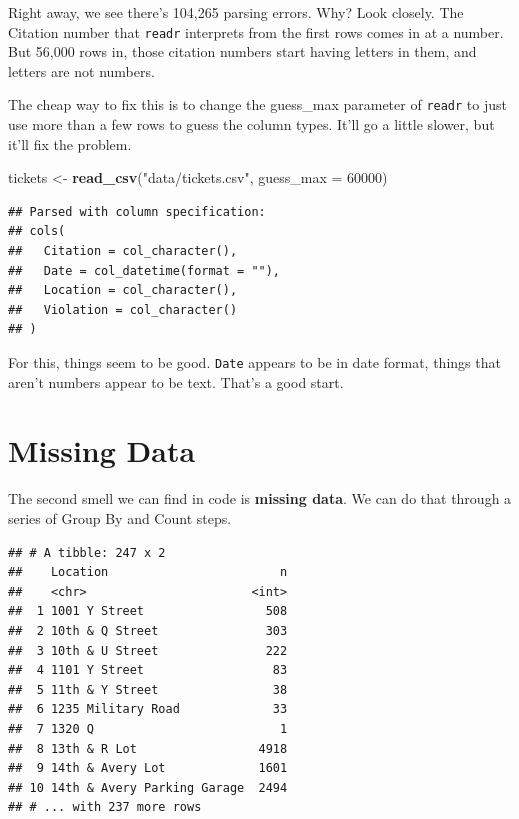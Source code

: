 \documentclass[]{book}
\newenvironment{Shaded}{\begin{snugshade}}{\end{snugshade}}
\newcommand{\DataTypeTok}[1]{\textcolor[rgb]{0.13,0.29,0.53}{#1}}
\newcommand{\DecValTok}[1]{\textcolor[rgb]{0.00,0.00,0.81}{#1}}
\newcommand{\KeywordTok}[1]{\textcolor[rgb]{0.13,0.29,0.53}{\textbf{#1}}}
\newcommand{\NormalTok}[1]{#1}
\newcommand{\OperatorTok}[1]{\textcolor[rgb]{0.81,0.36,0.00}{\textbf{#1}}}
\newcommand{\StringTok}[1]{\textcolor[rgb]{0.31,0.60,0.02}{#1}}
\begin{document}
Right away, we see there's 104,265 parsing errors. Why? Look closely. The Citation number that \texttt{readr} interprets from the first rows comes in at a number. But 56,000 rows in, those citation numbers start having letters in them, and letters are not numbers.

The cheap way to fix this is to change the guess\_max parameter of \texttt{readr} to just use more than a few rows to guess the column types. It'll go a little slower, but it'll fix the problem.

\begin{Shaded}
\begin{Highlighting}[]
\NormalTok{tickets <-}\StringTok{ }\KeywordTok{read_csv}\NormalTok{(}\StringTok{"data/tickets.csv"}\NormalTok{, }\DataTypeTok{guess_max =} \DecValTok{60000}\NormalTok{)}
\end{Highlighting}
\end{Shaded}

\begin{verbatim}
## Parsed with column specification:
## cols(
##   Citation = col_character(),
##   Date = col_datetime(format = ""),
##   Location = col_character(),
##   Violation = col_character()
## )
\end{verbatim}

For this, things seem to be good. \texttt{Date} appears to be in date format, things that aren't numbers appear to be text. That's a good start.

\hypertarget{missing-data}{%
\section{Missing Data}\label{missing-data}}

The second smell we can find in code is \textbf{missing data}. We can do that through a series of Group By and Count steps.

\begin{Shaded}
\end{Shaded}

\begin{verbatim}
## # A tibble: 247 x 2
##    Location                        n
##    <chr>                       <int>
##  1 1001 Y Street                 508
##  2 10th & Q Street               303
##  3 10th & U Street               222
##  4 1101 Y Street                  83
##  5 11th & Y Street                38
##  6 1235 Military Road             33
##  7 1320 Q                          1
##  8 13th & R Lot                 4918
##  9 14th & Avery Lot             1601
## 10 14th & Avery Parking Garage  2494
## # ... with 237 more rows
\end{verbatim}
\end{document}
